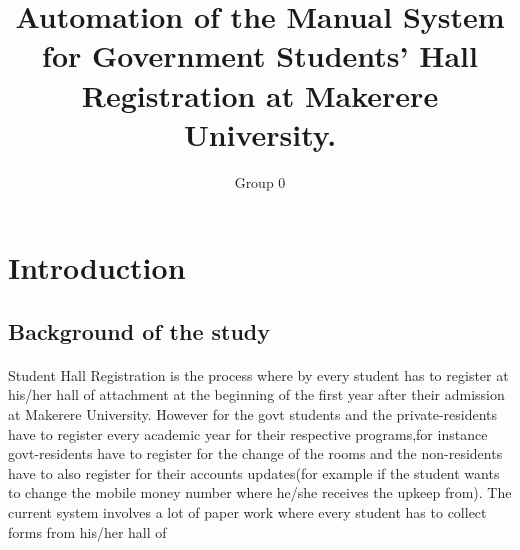 \documentclass[12pt]{article}
\begin{document}
	\title{Automation of the Manual System for Government Students’ Hall Registration at Makerere University.}
	
	\author{Group 0}
	
	\maketitle
	\section{Introduction}
	\subsection{Background of the study}
	\paragraph{}
	Student Hall Registration is the process where by every student has to register at his/her hall of attachment at the beginning of the first year after their admission at Makerere University.
	However for the govt students and the private-residents have to register every academic year for their respective programs,for instance govt-residents have to register for the change of the rooms and the non-residents have to also register for their accounts updates(for example if the student wants to change the mobile money number where he/she receives the upkeep from).
	The current system involves a lot of paper work where every student has to collect forms from his/her hall of
\end{document}
